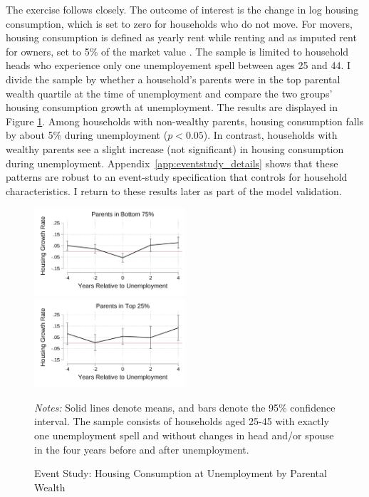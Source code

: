 \documentclass[12pt]{article}
\begin{document}
The exercise follows \cite{Chetty2007} closely. The outcome of interest is the change in log housing consumption, which is set to zero for households who do not move. For movers, housing consumption is defined as yearly rent while renting and as imputed rent for owners, set to 5\% of the market value \citep{Davis2008}. The sample is limited to household heads who experience only one unemployement spell between ages 25 and 44. I divide the sample by whether a household's parents were in the top parental wealth quartile at the time of unemployment and compare the two groups' housing consumption growth at unemployment. The results are displayed in Figure \ref{fig:housinggrowthrates}. Among households with non-wealthy parents, housing consumption falls by about 5\% during unemployment ($p<0.05$). In contrast, households with wealthy parents see a slight increase (not significant) in housing consumption during unemployment. Appendix~\ref{app:eventstudy_details} shows that these patterns are robust to an event-study specification that controls for household characteristics. I return to these results later as part of the model validation.




\begin{figure}
	\caption{Event Study: Housing Consumption at Unemployment by Parental Wealth}\label{fig:housinggrowthrates}
	\noindent%
	\includegraphics[width=0.5\textwidth]{../tabfig/descr/PSID_housinggrowthpoor_both}%
	\includegraphics[width=0.5\textwidth]{../tabfig/descr/PSID_housinggrowthrich_both}

	{\begin{footnotesize} \textit{Notes:} Solid lines denote means, and bars denote the 95\% confidence interval. The sample consists of households aged 25-45 with exactly one unemployment spell and without changes in head and/or spouse in the four years before and after unemployment. \end{footnotesize}}
\end{figure}
\end{document}
